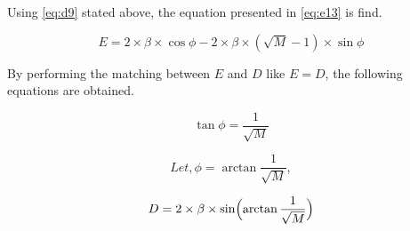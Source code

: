 Using \eqref{eq:d9} stated above, the equation presented in
\eqref{eq:e13} is find.

\begin{equation}
  E = 2 \times \beta \times \cos\phi
      - 2 \times \beta \times (\sqrt{M} - 1) \times \sin\phi
  \label{eq:e13}
\end{equation}

By performing the matching between $E$ and $D$ like $E = D$, the following
equations are obtained.

\begin{equation}
  \tan\phi = \frac{1}{\sqrt{M}}
  \label{eq:tan}
\end{equation}

\begin{equation}
  \textit{Let}, \phi = \arctan\frac{1}{\sqrt{M}},
  \label{eq:let}
\end{equation}

\begin{equation}
  D = 2 \times \beta \times \sin\Bigl(\arctan\frac{1}{\sqrt{M}}\Bigr)
  \label{eq:d16}
\end{equation}